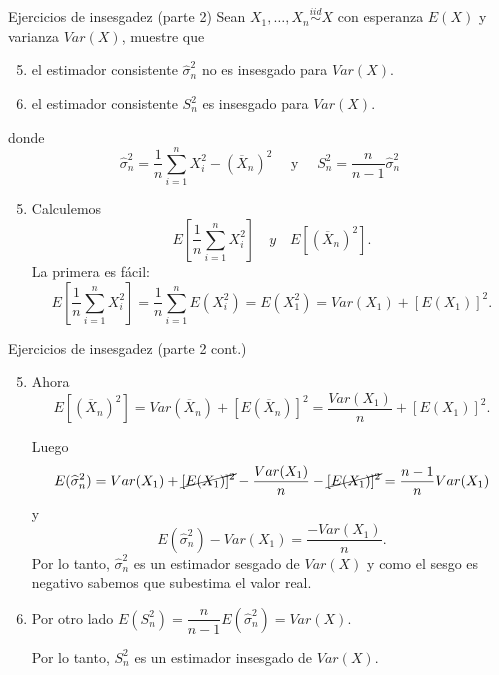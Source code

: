 \documentclass{beamer}
\theoremstyle{definition}
\begin{document}
\begin{frame}{\color{rosee}Ejercicios de insesgadez (parte 2)}\small
  Sean $X_{1},\dots,X_{n}\stackrel{iid}{\sim} X$ con esperanza
    $E(X)$ y varianza $Var(X)$, muestre que 
  \begin{enumerate}
  \setcounter{enumi}{4}

      \item el estimador consistente $\widehat{\sigma}_n^{2}$ no es insesgado para $Var(X)$.
    
    \item el estimador consistente $S_n^{2}$ es insesgado para $Var(X)$.
    \end{enumerate}
\noindent donde    
    \[\widehat{\sigma}_n^{2}= \frac{1}{n}\sum\limits_{i=1}^{n}X_{i}^{2} -
    (\overline{X}_{n})^{2} \quad \text{ y } \quad S_n^2=\dfrac{n}{n-1}\widehat{\sigma}_n^{2} \]
    \color{gray}
      \begin{enumerate}
  \setcounter{enumi}{4}
\item      Calculemos
    \[E\left[\frac{1}{n}\sum\limits_{i=1}^{n}X_{i}^{2} \right] \quad y
    \quad E\left[ (\overline{X}_{n})^{2}\right].\]
    La primera es f\'acil:
    \[E\left[\frac{1}{n}\sum_{i=1}^{n}X_{i}^{2} \right] =
    \frac{1}{n}\sum_{i=1}^{n}E(X_{i}^{2}) =
    E(X_{1}^{2})=Var(X_1)+\left[E(X_1)\right]^{2}.\]
  
  \end{enumerate}
\end{frame}


\begin{frame}{\color{rosee}Ejercicios de insesgadez (parte 2 cont.)}\small
  \color{gray}
        \begin{enumerate}
  \setcounter{enumi}{4}
   \item  Ahora 
    \[E\left[ (\overline{X}_{n})^{2}\right]=Var(\overline{X}_{n}) +
    [E(\overline{X}_{n})]^{2}=\frac{Var(X_1)}{n}+[E(X_1)]^{2}.\] 
    
    Luego
    \[ E(\widehat{\sigma}_n^{2})= Var(X_1) + \cancel{[E(X_1)]^{2}} -
    \frac{Var(X_1)}{n} - \cancel{[E(X_1)]^{2}}=\frac{n-1}{n}
    Var(X_1)\] y
    \[ E(\widehat{\sigma}_n^{2}) - Var(X_1)= \frac{-Var(X_1)}{n}.\]
    Por lo tanto, $\widehat{\sigma}_n^{2}$ es un estimador sesgado de
    $Var(X)$ y como el sesgo es negativo sabemos que subestima el valor real.
    
    \vspace{8pt}
    
    \item Por otro lado $E(S_n^2)=\dfrac{n}{n-1}E(\widehat{\sigma}_n^{2})=Var(X)$.
    
     Por lo tanto, $S_n^{2}$ es un estimador insesgado de
    $Var(X)$.
  \end{enumerate}
\end{frame}
\end{document}
